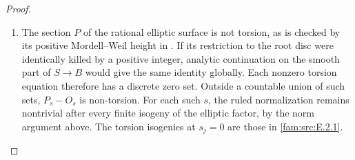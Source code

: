 \begin{proof}
\begin{enumerate}[label=\arabic*.,leftmargin=*]
\item The section $P$ of the rational elliptic surface is not
torsion, as is checked by its positive Mordell--Weil height
in \cite[proof of Lemma~2.1, pp.~3--4]{Engel2026}. If its restriction to the root disc
were identically killed by a positive integer, analytic
continuation on the smooth part of $S\to B$ would give the
same identity globally. Each nonzero torsion equation
therefore has a discrete zero set. Outside a countable union
of such sets, $P_s-O_s$ is non-torsion. For each such $s$, the ruled normalization remains nontrivial
after every finite isogeny of the elliptic factor, by the norm
argument above. The torsion isogenies at $s_j=0$ are those
in \cref{fam:src:E.2.1}.
\end{enumerate}
\end{proof}
